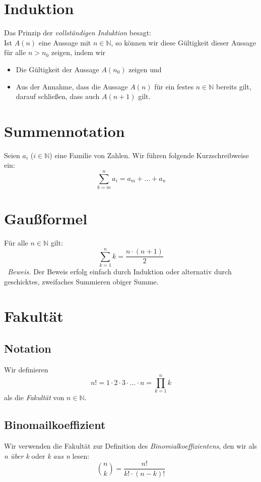 \documentclass{scrreprt}
\newenvironment{proof}{\emph{\ Beweis.}}{}
\newcommand{\NN}{\mathbb{N}}
\begin{document}
	\section{Induktion}
	Das Prinzip der \emph{vollständigen Induktion} besagt: \\
	Ist $A(n)$ eine Aussage mit $n \in \NN$, so können wir diese Gültigkeit dieser Aussage für alle $n > n_0$ zeigen, indem wir
	\begin{itemize}
		\item
			Die Gültigkeit der Aussage $A(n_0)$ zeigen und
		\item
			Aus der Annahme, dass die Aussage $A(n)$ für ein festes $n \in \NN$ bereits gilt, darauf schließen, dass auch $A(n + 1)$ gilt.
	\end{itemize}

	\section{Summennotation}
	Seien $a_i$ ($i \in \NN$) eine Familie von Zahlen. Wir führen folgende Kurzschreibweise ein:
	\begin{equation*}
		\sum\limits_{k=m}^n a_i = a_m + \dots + a_n
	\end{equation*}

	\section{Gaußformel}
	Für alle $n \in \NN$ gilt: 
	\begin{equation*}
			\sum\limits_{k=1}^n k = \frac{n \cdot (n + 1)}{2}
	\end{equation*}
	\begin{proof}
		Der Beweis erfolg einfach durch Induktion oder alternativ durch geschicktes, zweifaches Summieren obiger Summe.  
	\end{proof}

	\section{Fakultät}
		\subsection{Notation}
		Wir definieren
		\begin{equation*}
			n ! = 1 \cdot 2 \cdot 3 \cdot \dots \cdot n = \prod\limits_{k=1}^n k 
		\end{equation*}
		als die \emph{Fakultät} von $n \in \NN$.
		\subsection{Binomailkoeffizient}
		Wir verwenden die Fakultät zur Definition des \emph{Binomialkoeffizientens}, den wir als \emph{n über k} oder \emph{k aus n} lesen:
		\begin{equation*} 
			\binom{n}{k} = \frac{n!}{k! \cdot (n-k)!}
		\end{equation*}
\end{document}
